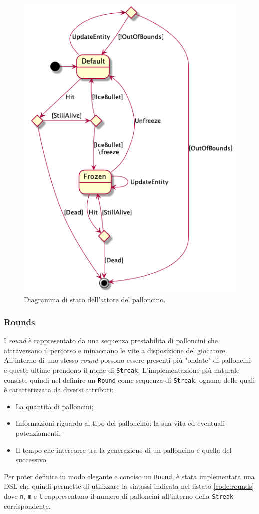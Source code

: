 \begin{figure}[H]
    \centering
    \includegraphics[width=.5\linewidth]{img/state-balloon-actor}
    \caption{Diagramma di stato dell'attore del palloncino.}
    \label{fig:state-balloon-actor}
\end{figure}

\subsubsection{Rounds}
I \textit{round} è rappresentato da una sequenza prestabilita di palloncini che attraversano il percorso e minacciano le
vite a disposizione del giocatore. All'interno di uno stesso \textit{round} possono essere presenti più "ondate" di
palloncini e queste ultime prendono il nome di \texttt{Streak}. L'implementazione più naturale consiste quindi nel
definire un \texttt{Round} come sequenza di \texttt{Streak}, ognuna delle quali è caratterizzata da diversi attributi:
\begin{itemize}
    \item La quantità di palloncini;
    \item Informazioni riguardo al tipo del palloncino: la sua vita ed eventuali potenziamenti;
    \item Il tempo che intercorre tra la generazione di un palloncino e quella del successivo.
\end{itemize}

Per poter definire in modo elegante e conciso un \texttt{Round}, è stata implementata una DSL che quindi permette di
utilizzare la sintassi indicata nel listato \ref{code:rounds} dove \texttt{n}, \texttt{m} e \texttt{l} rappresentano il
numero di palloncini all'interno della \texttt{Streak} corrispondente.


